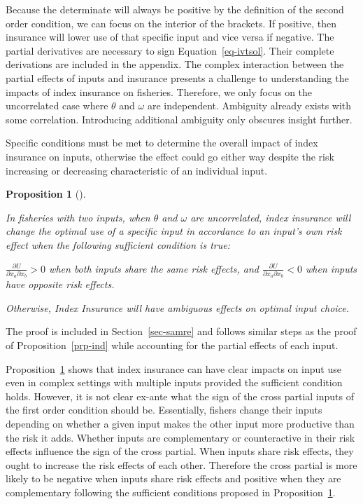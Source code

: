 \documentclass[
  letterpaper,
  DIV=11,
  numbers=noendperiod]{scrartcl}
\theoremstyle{plain}
\theoremstyle{plain}
\newtheorem{proposition}{Proposition}[section]
\theoremstyle{remark}
\begin{document}
Because the determinate will always be positive by the definition of the
second order condition, we can focus on the interior of the brackets. If
positive, then insurance will lower use of that specific input and vice
versa if negative. The partial derivatives are necessary to sign
Equation~\ref{eq-ivtsol}. Their complete derivations are included in the
appendix. The complex interaction between the partial effects of inputs
and insurance presents a challenge to understanding the impacts of index
insurance on fisheries. Therefore, we only focus on the uncorrelated
case where \(\theta\) and \(\omega\) are independent. Ambiguity already
exists with some correlation. Introducing additional ambiguity only
obscures insight further.

Specific conditions must be met to determine the overall impact of index
insurance on inputs, otherwise the effect could go either way despite
the risk increasing or decreasing characteristic of an individual input.

\begin{proposition}[]\protect\hypertarget{prp-samre}{}\label{prp-samre}

In fisheries with two inputs, when \(\theta\) and \(\omega\) are
uncorrelated, index insurance will change the optimal use of a specific
input in accordance to an input's own risk effect when the following
sufficient condition is true:

\(\frac{\partial U}{\partial x_a\partial x_b}>0\) when both inputs share
the same risk effects, and
\(\frac{\partial U}{\partial x_a\partial x_b}<0\) when inputs have
opposite risk effects.

Otherwise, Index Insurance will have ambiguous effects on optimal input
choice.

\end{proposition}

The proof is included in Section~\ref{sec-samre} and follows similar
steps as the proof of Proposition~\ref{prp-ind} while accounting for the
partial effects of each input.

Proposition~\ref{prp-samre} shows that index insurance can have clear
impacts on input use even in complex settings with multiple inputs
provided the sufficient condition holds. However, it is not clear
ex-ante what the sign of the cross partial inputs of the first order
condition should be. Essentially, fishers change their inputs depending
on whether a given input makes the other input more productive than the
risk it adds. Whether inputs are complementary or counteractive in their
risk effects influence the sign of the cross partial. When inputs share
risk effects, they ought to increase the risk effects of each other.
Therefore the cross partial is more likely to be negative when inputs
share risk effects and positive when they are complementary following
the sufficient conditions proposed in Proposition~\ref{prp-samre}.
\end{document}
